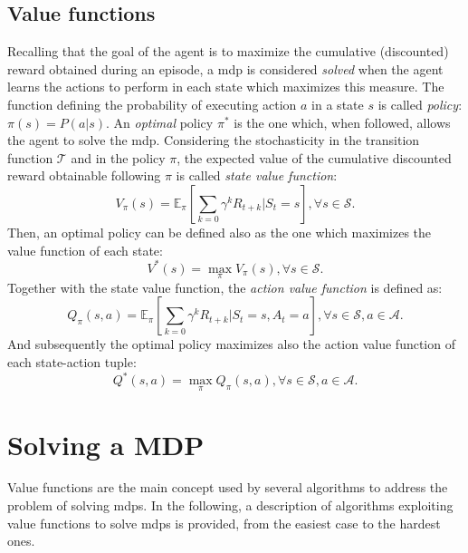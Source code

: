 \subsection{Value functions}
Recalling that the goal of the agent is to maximize the cumulative (discounted) reward obtained during an episode, a \gls{mdp} is considered \textit{solved} when the agent learns the actions to perform in each state which maximizes this measure. The function defining the probability of executing action $a$ in a state $s$ is called \textit{policy}: $\pi(s) = P(a|s)$. An \textit{optimal} policy $\pi^*$ is the one which, when followed, allows the agent to solve the \gls{mdp}. Considering the stochasticity in the transition function $\mathcal{T}$ and in the policy $\pi$, the expected value of the cumulative discounted reward obtainable following $\pi$ is called \textit{state value function}:
\begin{equation}
 V_\pi(s) = \mathbb{E}_\pi[\sum_{k=0} \gamma^k R_{t+k} | S_t = s], \forall s \in \mathcal{S}.
\end{equation}
Then, an optimal policy can be defined also as the one which maximizes the value function of each state:
\begin{equation}
 V^*(s) = \max_\pi V_\pi(s), \forall s \in \mathcal{S}.
\end{equation}
Together with the state value function, the \textit{action value function} is defined as:
\begin{equation}
 Q_\pi(s, a) = \mathbb{E}_\pi[\sum_{k=0} \gamma^k R_{t+k} | S_t = s, A_t = a], \forall s \in \mathcal{S}, a \in \mathcal{A}.
\end{equation}
And subsequently the optimal policy maximizes also the action value function of each state-action tuple:
\begin{equation}
 Q^*(s,a) = \max_\pi Q_\pi(s,a), \forall s \in \mathcal{S}, a \in \mathcal{A}.
\end{equation}

\section{Solving a MDP}
Value functions are the main concept used by several algorithms to address the problem of solving \glspl{mdp}. In the following, a description of algorithms exploiting value functions to solve \glspl{mdp} is provided, from the easiest case to the hardest ones.

